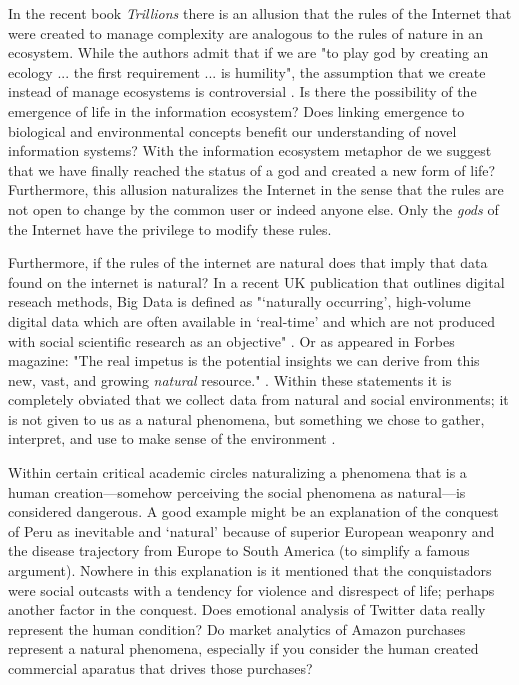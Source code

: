 In the recent book \textit{Trillions} there is an allusion that the rules of the Internet that were created to manage complexity are analogous to the rules of nature in an ecosystem. While the authors admit that if we are "to play god by creating an ecology ... the first requirement ... is humility", the assumption that we create instead of manage ecosystems is controversial \citep[][p. 140]{lucas_2012}. Is there the possibility of the emergence of life in the information ecosystem? Does linking emergence to biological and environmental concepts benefit our understanding of novel information systems? With the information ecosystem metaphor de we suggest that we have finally reached the status of a god and created a new form of life? Furthermore, this allusion naturalizes the Internet in the sense that the rules are not open to change by the common user or indeed anyone else. Only the \textit{gods} of the Internet have the privilege to modify these rules. 

Furthermore, if the rules of the internet are natural does that imply that data found on the internet is natural? In a recent UK publication that outlines digital reseach methods, Big Data is defined as "‘naturally occurring’, high-volume digital data which are often available in ‘real-time’ and which are not produced with social scientific research as an objective" \citep{ncrm_2015}. Or as appeared in Forbes magazine: "The real impetus is the potential insights we can derive from this new, vast, and growing \textit{natural} resource." \citep[][emphasis ours]{rotella_2012}. Within these statements it is completely obviated that we collect data from natural and social environments; it is not given to us as a natural phenomena, but something we chose to gather, interpret, and use to make sense of the environment \citep{kitchin_2014}.

Within certain critical academic circles naturalizing a phenomena that is a human creation—somehow perceiving the social phenomena as natural—is considered dangerous. A good example might be an explanation of the conquest of Peru as inevitable and ‘natural’ because of superior European weaponry and the disease trajectory from Europe to South America (to simplify a famous argument). Nowhere in this explanation is it mentioned that the conquistadors were social outcasts with a tendency for violence and disrespect of life; perhaps another factor in the conquest. Does emotional analysis of Twitter data really represent the human condition? Do market analytics of Amazon purchases represent a natural phenomena, especially if you consider the human created commercial aparatus that drives those purchases?  

